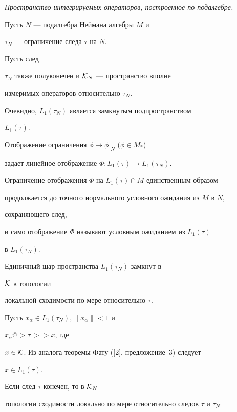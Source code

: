 {\it Пространство интегрируемых операторов, построенное по подалгебре.}


Пусть $N$ --- подалгебра Неймана алгебры $M$ и


$\tau_N$ --- ограничение следа $\tau$ на $N$.


Пусть след


$\tau_N$ также полуконечен и ${\cal K}_{N}$ --- пространство вполне


измеримых операторов относительно $\tau_{N}$.


Очевидно, $L_{1}(\tau _N)$ является замкнутым подпространством


$L_{1}(\tau)$.


Отображение ограничения $\phi \mapsto \phi |_N$ ($\phi \in M_*$)


задает линейное отображение $\Phi:L_{1}(\tau)\to L_{1}(\tau _N)$.


Ограничение отображения $\Phi$ на $L_{1}(\tau) \cap M$ единственным образом


продолжается до точного нормального условного ожидания из $M$ в $N$,


сохраняющего след,


и само отображение $\Phi$ называют условным ожиданием из $L_{1}(\tau)$


в $L_{1}(\tau _N)$.





\begin{lem}


Единичный шар пространства $L_{1}(\tau_{N})$ замкнут в


$\cal K$ в топологии


локальной сходимости по мере относительно $\tau$.


\end{lem}





Пусть $x_{\alpha}\in L_{1}(\tau_{N}), \| x_{\alpha}\|<1$ и


$x_{\alpha}@>{\tau\,}>> x$, где


$x\in {\cal K}$. Из аналога теоремы Фату ([2], предложение~3) следует


$x\in L_{1}(\tau)$. 





Если след $\tau$ конечен, то в ${\cal K}_{N}$


топологии сходимости локально по мере относительно следов $\tau$ и $\tau_{N}$


